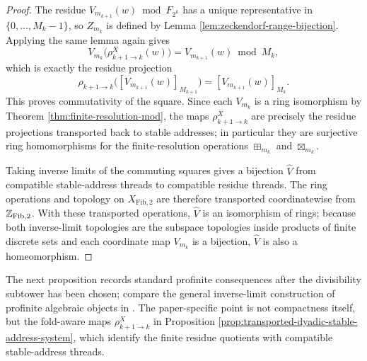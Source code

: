 \begin{proof}
The residue \(V_{m_{k+1}}(w)\bmod F_{2^k}\) has a unique representative in \(\{0,\dots,M_k-1\}\), so \(Z_{m_k}\) is defined by Lemma \ref{lem:zeckendorf-range-bijection}. Applying the same lemma again gives
\[
V_{m_k}\bigl(\rho^X_{k+1\to k}(w)\bigr)
=V_{m_{k+1}}(w)\bmod M_k,
\]
which is exactly the residue projection
\[
\rho_{k+1\to k}\bigl([V_{m_{k+1}}(w)]_{M_{k+1}}\bigr)
=[V_{m_{k+1}}(w)]_{M_k}.
\]
This proves commutativity of the square. Since each \(V_{m_k}\) is a ring isomorphism by Theorem \ref{thm:finite-resolution-mod}, the maps \(\rho^X_{k+1\to k}\) are precisely the residue projections transported back to stable addresses; in particular they are surjective ring homomorphisms for the finite-resolution operations \(\boxplus_{m_k}\) and \(\boxtimes_{m_k}\).

Taking inverse limits of the commuting squares gives a bijection \(\widehat V\) from compatible stable-address threads to compatible residue threads. The ring operations and topology on \(X_{\mathrm{Fib},2}\) are therefore transported coordinatewise from \(\mathbb{Z}_{\mathrm{Fib},2}\). With these transported operations, \(\widehat V\) is an isomorphism of rings; because both inverse-limit topologies are the subspace topologies inside products of finite discrete sets and each coordinate map \(V_{m_k}\) is a bijection, \(\widehat V\) is also a homeomorphism.
\end{proof}

The next proposition records standard profinite consequences after the divisibility subtower has been chosen; compare the general inverse-limit construction of profinite algebraic objects in \cite[Chapter~1]{RibesZalesskii2010}. The paper-specific point is not compactness itself, but the fold-aware maps \(\rho^X_{k+1\to k}\) in Proposition \ref{prop:transported-dyadic-stable-address-system}, which identify the finite residue quotients with compatible stable-address threads.

